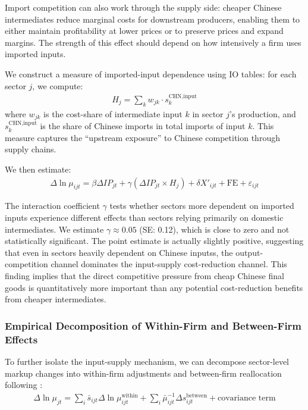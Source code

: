 \documentclass[12pt]{article}
\begin{document}
Import competition can also work through the supply side: cheaper Chinese intermediates reduce marginal costs for downstream producers, enabling them to either maintain profitability at lower prices or to preserve prices and expand margins. The strength of this effect should depend on how intensively a firm uses imported inputs.

We construct a measure of imported-input dependence using IO tables: for each sector $j$, we compute:
\begin{align}
H_j = \sum_{k} w_{jk} \cdot s_{k}^{\text{CHN,input}}
\end{align}
where $w_{jk}$ is the cost-share of intermediate input $k$ in sector $j$'s production, and $s_{k}^{\text{CHN,input}}$ is the share of Chinese imports in total imports of input $k$. This measure captures the ``upstream exposure'' to Chinese competition through supply chains.

We then estimate:
\begin{align}
\Delta \ln \mu_{ijt} = \beta \Delta IP_{jt} + \gamma (\Delta IP_{jt} \times H_j) + \delta X'_{ijt} + \text{FE} + \varepsilon_{ijt}
\end{align}

The interaction coefficient $\gamma$ tests whether sectors more dependent on imported inputs experience different effects than sectors relying primarily on domestic intermediates. We estimate $\gamma \approx 0.05$ (SE: 0.12), which is close to zero and not statistically significant. The point estimate is actually slightly positive, suggesting that even in sectors heavily dependent on Chinese inputss, the output-competition channel dominates the input-supply cost-reduction channel. This finding implies that the direct competitive pressure from cheap Chinese final goods is quantitatively more important than any potential cost-reduction benefits from cheaper intermediates.

\subsubsection{Empirical Decomposition of Within-Firm and Between-Firm Effects}

To further isolate the input-supply mechanism, we can decompose sector-level markup changes into within-firm adjustments and between-firm reallocation following \cite{bursteinBottomUpMarkupFluctuations2025}:
\begin{align}
\Delta \ln \mu_{jt} = \sum_i \bar{s}_{ijt} \Delta \ln \mu_{ijt}^{\text{within}} + \sum_i \bar{\mu}_{ijt}^{-1} \Delta s_{ijt}^{\text{between}} + \text{covariance term}
\end{align}
\end{document}
